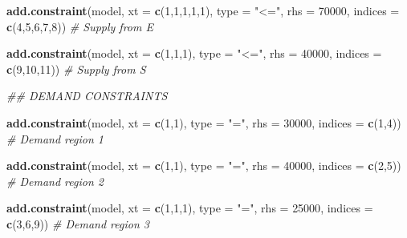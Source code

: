 \documentclass[]{article}
\newenvironment{Shaded}{\begin{snugshade}}{\end{snugshade}}
\newcommand{\CommentTok}[1]{\textcolor[rgb]{0.56,0.35,0.01}{\textit{#1}}}
\newcommand{\DataTypeTok}[1]{\textcolor[rgb]{0.13,0.29,0.53}{#1}}
\newcommand{\DecValTok}[1]{\textcolor[rgb]{0.00,0.00,0.81}{#1}}
\newcommand{\KeywordTok}[1]{\textcolor[rgb]{0.13,0.29,0.53}{\textbf{#1}}}
\newcommand{\NormalTok}[1]{#1}
\newcommand{\StringTok}[1]{\textcolor[rgb]{0.31,0.60,0.02}{#1}}
\begin{document}
\begin{Shaded}
\begin{Highlighting}[]
\KeywordTok{add.constraint}\NormalTok{(model,}
               \DataTypeTok{xt =} \KeywordTok{c}\NormalTok{(}\DecValTok{1}\NormalTok{,}\DecValTok{1}\NormalTok{,}\DecValTok{1}\NormalTok{,}\DecValTok{1}\NormalTok{,}\DecValTok{1}\NormalTok{),}
               \DataTypeTok{type =} \StringTok{"<="}\NormalTok{,}
               \DataTypeTok{rhs =} \DecValTok{70000}\NormalTok{,}
               \DataTypeTok{indices =} \KeywordTok{c}\NormalTok{(}\DecValTok{4}\NormalTok{,}\DecValTok{5}\NormalTok{,}\DecValTok{6}\NormalTok{,}\DecValTok{7}\NormalTok{,}\DecValTok{8}\NormalTok{)) }\CommentTok{# Supply from E}

\KeywordTok{add.constraint}\NormalTok{(model,}
               \DataTypeTok{xt =} \KeywordTok{c}\NormalTok{(}\DecValTok{1}\NormalTok{,}\DecValTok{1}\NormalTok{,}\DecValTok{1}\NormalTok{),}
               \DataTypeTok{type =} \StringTok{"<="}\NormalTok{,}
               \DataTypeTok{rhs =} \DecValTok{40000}\NormalTok{,}
               \DataTypeTok{indices =} \KeywordTok{c}\NormalTok{(}\DecValTok{9}\NormalTok{,}\DecValTok{10}\NormalTok{,}\DecValTok{11}\NormalTok{)) }\CommentTok{# Supply from S}

\CommentTok{## DEMAND CONSTRAINTS}

\KeywordTok{add.constraint}\NormalTok{(model,}
               \DataTypeTok{xt =} \KeywordTok{c}\NormalTok{(}\DecValTok{1}\NormalTok{,}\DecValTok{1}\NormalTok{),}
               \DataTypeTok{type =} \StringTok{"="}\NormalTok{,}
               \DataTypeTok{rhs =} \DecValTok{30000}\NormalTok{,}
               \DataTypeTok{indices =} \KeywordTok{c}\NormalTok{(}\DecValTok{1}\NormalTok{,}\DecValTok{4}\NormalTok{)) }\CommentTok{# Demand region 1}

\KeywordTok{add.constraint}\NormalTok{(model,}
               \DataTypeTok{xt =} \KeywordTok{c}\NormalTok{(}\DecValTok{1}\NormalTok{,}\DecValTok{1}\NormalTok{),}
               \DataTypeTok{type =} \StringTok{"="}\NormalTok{,}
               \DataTypeTok{rhs =} \DecValTok{40000}\NormalTok{,}
               \DataTypeTok{indices =} \KeywordTok{c}\NormalTok{(}\DecValTok{2}\NormalTok{,}\DecValTok{5}\NormalTok{)) }\CommentTok{# Demand region 2}

\KeywordTok{add.constraint}\NormalTok{(model,}
               \DataTypeTok{xt =} \KeywordTok{c}\NormalTok{(}\DecValTok{1}\NormalTok{,}\DecValTok{1}\NormalTok{,}\DecValTok{1}\NormalTok{),}
               \DataTypeTok{type =} \StringTok{"="}\NormalTok{,}
               \DataTypeTok{rhs =} \DecValTok{25000}\NormalTok{,}
               \DataTypeTok{indices =} \KeywordTok{c}\NormalTok{(}\DecValTok{3}\NormalTok{,}\DecValTok{6}\NormalTok{,}\DecValTok{9}\NormalTok{)) }\CommentTok{# Demand region 3}


\end{Highlighting}
\end{Shaded}
\end{document}
